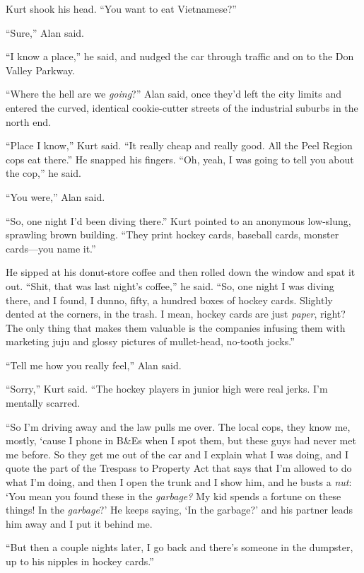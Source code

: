 Kurt shook his head.  ``You want to eat Vietnamese?''

``Sure,'' Alan said.

``I know a place,'' he said, and nudged the car through traffic and on
to the Don Valley Parkway.

``Where the hell are we \textit{going}?'' Alan said, once they'd left
the city limits and entered the curved, identical cookie-cutter
streets of the industrial suburbs in the north end.

``Place I know,'' Kurt said.  ``It really cheap and really good.  All
the Peel Region cops eat there.'' He snapped his fingers.  ``Oh, yeah,
I was going to tell you about the cop,'' he said.

``You were,'' Alan said.

``So, one night I'd been diving there.'' Kurt pointed to an anonymous
low-slung, sprawling brown building.  ``They print hockey cards,
baseball cards, monster cards---you name it.''

He sipped at his donut-store coffee and then rolled down the window
and spat it out.  ``Shit, that was last night's coffee,'' he said. 
``So, one night I was diving there, and I found, I dunno, fifty, a
hundred boxes of hockey cards.  Slightly dented at the corners, in the
trash.  I mean, hockey cards are just \textit{paper}, right?  The only
thing that makes them valuable is the companies infusing them with
marketing juju and glossy pictures of mullet-head, no-tooth jocks.''

``Tell me how you really feel,'' Alan said.

``Sorry,'' Kurt said.  ``The hockey players in junior high were real
jerks.  I'm mentally scarred.

``So I'm driving away and the law pulls me over.  The local cops, they
know me, mostly, `cause I phone in B\&Es when I spot them, but
these guys had never met me before.  So they get me out of the car and
I explain what I was doing, and I quote the part of the Trespass to
Property Act that says that I'm allowed to do what I'm doing, and then
I open the trunk and I show him, and he busts a \textit{nut}:  `You
mean you found these in the \textit{garbage?} My kid spends a fortune
on these things!  In the \textit{garbage}?' He keeps saying, `In the
garbage?' and his partner leads him away and I put it behind me.

``But then a couple nights later, I go back and there's someone in the
dumpster, up to his nipples in hockey cards.''

